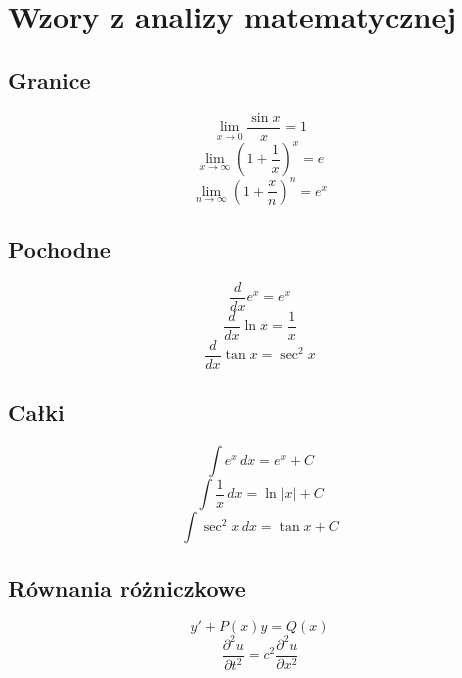 \documentclass{article}
\begin{document}
\section*{Wzory z analizy matematycznej}

\subsection*{Granice}

\[
    \lim_{x \to 0} \frac{\sin x}{x} = 1
\]
\[
    \lim_{x \to \infty} \left(1 + \frac{1}{x}\right)^x = e
\]
\[
    \lim_{n \to \infty} \left(1 + \frac{x}{n}\right)^n = e^x
\]

\subsection*{Pochodne}

\[
    \frac{d}{dx} e^x = e^x
\]
\[
    \frac{d}{dx} \ln x = \frac{1}{x}
\]
\[
    \frac{d}{dx} \tan x = \sec^2 x
\]

\subsection*{Całki}

\[
    \int e^x \,dx = e^x + C
\]
\[
    \int \frac{1}{x} \,dx = \ln |x| + C
\]
\[
    \int \sec^2 x \,dx = \tan x + C
\]

\subsection*{Równania różniczkowe}

\[
    y' + P(x)y = Q(x)
\]
\[
    \frac{\partial^2 u}{\partial t^2} = c^2 \frac{\partial^2 u}{\partial x^2}
\]
\end{document}
